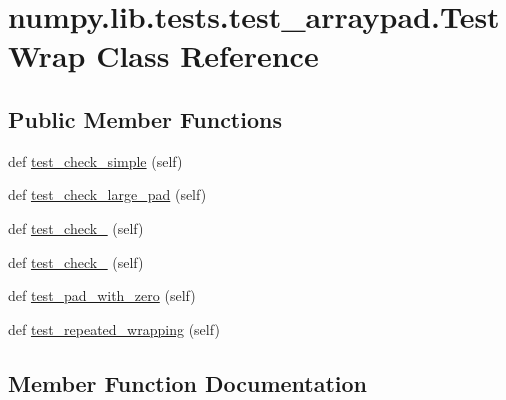 \hypertarget{classnumpy_1_1lib_1_1tests_1_1test__arraypad_1_1TestWrap}{}\section{numpy.\+lib.\+tests.\+test\+\_\+arraypad.\+Test\+Wrap Class Reference}
\label{classnumpy_1_1lib_1_1tests_1_1test__arraypad_1_1TestWrap}
\subsection*{Public Member Functions}
\begin{DoxyCompactItemize}
\item 
def \hyperlink{classnumpy_1_1lib_1_1tests_1_1test__arraypad_1_1TestWrap_ae19f2f45a32e1f6579ce8ab486f7df87}{test\+\_\+check\+\_\+simple} (self)
\item 
def \hyperlink{classnumpy_1_1lib_1_1tests_1_1test__arraypad_1_1TestWrap_a68b152ee17d315a4def24c6ffde9e087}{test\+\_\+check\+\_\+large\+\_\+pad} (self)
\item 
def \hyperlink{classnumpy_1_1lib_1_1tests_1_1test__arraypad_1_1TestWrap_ab5a1df93b78097b2d66eb86dbae6d4d1}{test\+\_\+check\+\_} (self)
\item 
def \hyperlink{classnumpy_1_1lib_1_1tests_1_1test__arraypad_1_1TestWrap_af4be9e7a4f8bd1b7b27b03b175f62443}{test\+\_\+check\+\_} (self)
\item 
def \hyperlink{classnumpy_1_1lib_1_1tests_1_1test__arraypad_1_1TestWrap_ab977ba1baec51c8441614b790029ac36}{test\+\_\+pad\+\_\+with\+\_\+zero} (self)
\item 
def \hyperlink{classnumpy_1_1lib_1_1tests_1_1test__arraypad_1_1TestWrap_ab4696174ce0e78e22dc47dcac7f5f347}{test\+\_\+repeated\+\_\+wrapping} (self)
\end{DoxyCompactItemize}


\subsection{Member Function Documentation}
\mbox{\label{classnumpy_1_1lib_1_1tests_1_1test__arraypad_1_1TestWrap_ab5a1df93b78097b2d66eb86dbae6d4d1}} 
